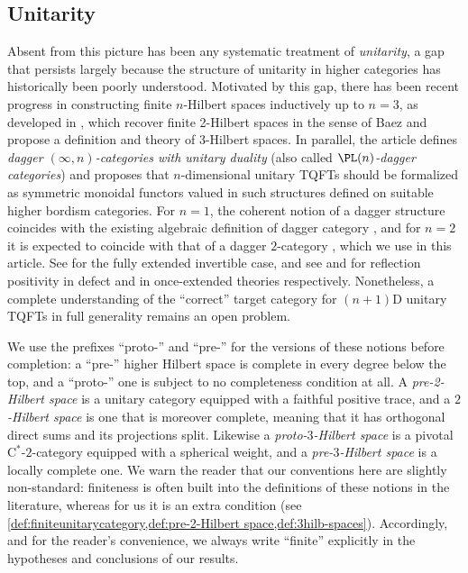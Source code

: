 \documentclass[12pt,reqno]{amsart}
\newcommand{\Cstar}{\ensuremath{\mathrm{C}^{*}}}
\newcommand{\defn}[1]{\emph{#1}}
\begin{document}
\subsection{Unitarity}
Absent from this picture has been any systematic treatment of \emph{unitarity}, a gap that persists largely because the structure of unitarity in higher categories has historically been poorly understood.
Motivated by this gap, there has been recent progress in constructing finite $n$-Hilbert spaces inductively up to $n = 3$, as developed in \cite{3Hilb}, which recover finite 2-Hilbert spaces in the sense of Baez \cite{Baez97} and propose a definition and theory of 3-Hilbert spaces. In parallel, the article \cite{FHJF24} defines \defn{dagger $(\infty, n)$-categories with unitary duality} (also called \defn{$\PL(n)$-dagger categories}) and proposes that $n$-dimensional unitary TQFTs should be formalized as symmetric monoidal functors valued in such structures defined on suitable higher bordism categories. For $n=1$, the coherent notion of a dagger structure coincides with the existing algebraic definition of dagger category \cite{SS23}, and for $n=2$ it is expected to coincide with that of a dagger $2$-category \cite{CHPJP22}, which we use in this article. See \cite{FH21} for the fully extended invertible case, and see \cite{M26} and \cite{MS26} for reflection positivity in defect and in once-extended theories respectively. Nonetheless, a complete understanding of the ``correct'' target category for $(n+1)$D unitary TQFTs in full generality remains an open problem.

We use the prefixes ``proto-'' and ``pre-'' for the versions of these notions before completion: a ``pre-'' higher Hilbert space is complete in every degree below the top, and a ``proto-'' one is subject to no completeness condition at all. A \defn{pre-2-Hilbert space} is a unitary category equipped with a faithful positive trace, and a \defn{$2$-Hilbert space} is one that is moreover complete, meaning that it has orthogonal direct sums and its projections split. Likewise a \defn{proto-$3$-Hilbert space} is a pivotal $\Cstar$-$2$-category equipped with a spherical weight, and a \defn{pre-$3$-Hilbert space} is a locally complete one.
We warn the reader that our conventions here are slightly non-standard: finiteness is often built into the definitions of these notions in the literature, whereas for us it is an extra condition (see \cref{def:finiteunitarycategory,def:pre-2-Hilbert space,def:3hilb-spaces}). Accordingly, and for the reader's convenience, we always write ``finite'' explicitly in the hypotheses and conclusions of our results.
\end{document}
